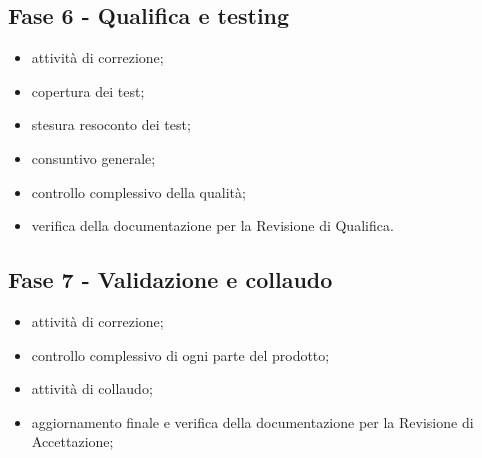    \subsection{Fase 6 - Qualifica e testing}
        \begin{itemize}
            \item attività di correzione;
            \item copertura dei test;
            \item stesura resoconto dei test;
            \item consuntivo generale;
            \item controllo complessivo della qualità;
            \item verifica della documentazione per la Revisione di Qualifica.
        \end{itemize}

    \subsection{Fase 7 - Validazione e collaudo}
        \begin{itemize}
            \item attività di correzione;
            \item controllo complessivo di ogni parte del prodotto;
            \item attività di collaudo;
            \item aggiornamento finale e verifica della documentazione per la Revisione di Accettazione;
        \end{itemize}